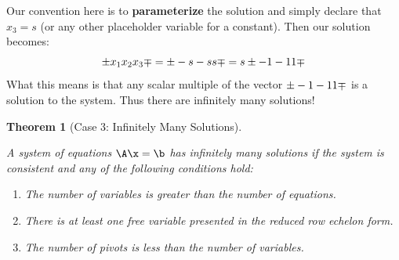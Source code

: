 \documentclass[
]{article}
\providecommand{\tightlist}{%
  \setlength{\itemsep}{0pt}\setlength{\parskip}{0pt}}
\newtheorem{theorem}{Theorem}[section]
\theoremstyle{definition}
\theoremstyle{definition}
\theoremstyle{definition}
\theoremstyle{definition}
\theoremstyle{remark}
\begin{document}
Our convention here is to \textbf{parameterize} the solution and simply declare that \(x_3=s\) (or any other placeholder variable for a constant). Then our solution becomes:
\[\pm x_1\\x_2\\x_3 \mp = \pm -s \\ -s \\ s \mp = s \pm -1\\-1\\1 \mp\]
What this means is that any scalar multiple of the vector \(\pm -1\\-1\\1 \mp\) is a solution to the system. Thus there are infinitely many solutions!



\begin{theorem}[Case 3: Infinitely Many Solutions]
\protect\hypertarget{thm:case3}{}\label{thm:case3}

A system of equations \(\A\x=\b\) has infinitely many solutions if the system is consistent and \emph{any} of the following conditions hold:

\begin{enumerate}
\def\labelenumi{\arabic{enumi}.}
\tightlist
\item
  The number of variables is greater than the number of equations.
\item
  There is at least one \emph{free variable} presented in the reduced row echelon form.
\item
  The number of pivots is less than the number of variables.
\end{enumerate}

\end{theorem}
\end{document}

